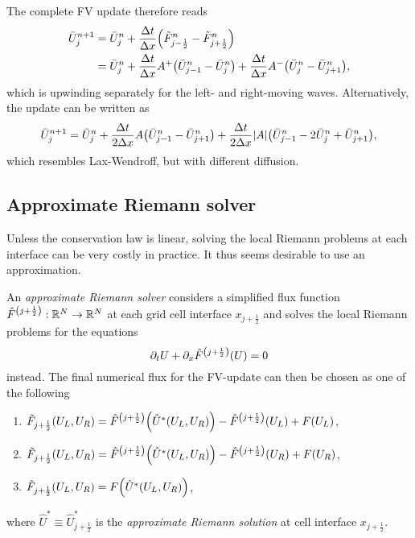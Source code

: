 \begin{example}
\[	\]
	The complete FV update therefore reads
	\begin{align*}
		\bar{U}_j^{n + 1} &= \bar{U}_j^n + \frac{\Delta t}{\Delta x}\parentheses*{\tilde{F}_{j - \frac{1}{2}}^n - \tilde{F}_{j + \frac{1}{2}}^n}\\
		&= \bar{U}_j^n + \frac{\Delta t}{\Delta x}A^+ \parentheses*{\bar{U}_{j - 1}^n - \bar{U}_j^n} + \frac{\Delta t}{\Delta x}A^- \parentheses*{\bar{U}_j^n - \bar{U}_{j + 1}^n},
	\end{align*}
	which is upwinding separately for the left- and right-moving waves.
	Alternatively, the update can be written as
	\[
		\bar{U}_j^{n + 1} = \bar{U}_j^n + \frac{\Delta t}{2\Delta x}A\parentheses*{\bar{U}_{j - 1}^n - \bar{U}_{j + 1}^n} + \frac{\Delta t}{2\Delta x}\absolute*{A}\parentheses*{\bar{U}_{j - 1}^n - 2\bar{U}_j^n + \bar{U}_{j + 1}^n},
	\]
	which resembles Lax-Wendroff, but with different diffusion.
\end{example}


\subsection{Approximate Riemann solver}

Unless the conservation law is linear, solving the local Riemann problems at each interface can be very costly in practice.
It thus seems desirable to use an approximation.

\begin{definition}\label{def:12-11}
	An \emph{approximate Riemann solver} considers a simplified flux function \(\hat{F}^{\parentheses*{j + \frac{1}{2}}}: \R^N \to \R^N\) at each grid cell interface \(x_{j + \frac{1}{2}}\) and solves the local Riemann problems for the equations
	\[
		\partial_t U + \partial_x \hat{F}^{\parentheses*{j + \frac{1}{2}}}\parentheses*{U} = 0
	\]
	instead.
	The final numerical flux for the FV-update can then be chosen as one of the following
	\begin{enumerate}
		\item \(\tilde{F}_{j + \frac{1}{2}}\parentheses*{U_L, U_R} = \hat{F}^{\parentheses*{j + \frac{1}{2}}}\parentheses*{\hat{U}^*\parentheses*{U_L, U_R}} - \hat{F}^{\parentheses*{j + \frac{1}{2}}}\parentheses*{U_L} + F\parentheses*{U_L}\),
		\item \(\tilde{F}_{j + \frac{1}{2}}\parentheses*{U_L, U_R} = \hat{F}^{\parentheses*{j + \frac{1}{2}}}\parentheses*{\hat{U}^*\parentheses*{U_L, U_R}} - \hat{F}^{\parentheses*{j + \frac{1}{2}}}\parentheses*{U_R} + F\parentheses*{U_R}\),
		\item \(\tilde{F}_{j + \frac{1}{2}}\parentheses*{U_L, U_R} = F\parentheses*{\hat{U}^*\parentheses*{U_L, U_R}}\),
	\end{enumerate}
	where \(\hat{U}^* \equiv \hat{U}_{j + \frac{1}{2}}^*\) is the \emph{approximate Riemann solution} at cell interface \(x_{j + \frac{1}{2}}\).
\end{definition}

